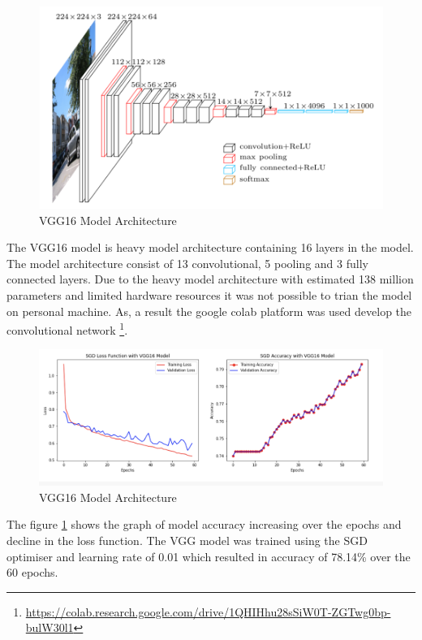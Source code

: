 \begin{figure}[!htp]
    \centering
    \includegraphics[width=\textwidth]{Images/vgg16.png}
    \caption{VGG16 Model Architecture}
\end{figure}

The VGG16 model is heavy model architecture containing 16 layers in the 
model. The model architecture consist of 13 convolutional, 5 pooling and 3 fully connected 
layers. Due to the heavy model architecture with estimated 138 million parameters
and limited hardware resources it was not possible to trian the model on personal machine. As, a result the google colab platform was used develop
the convolutional network \footnote{\url{https://colab.research.google.com/drive/1QHIHhu28sSiW0T-ZGTwg0bp-bulW30l1}}.

\begin{figure}[!htp]
    \centering
    \includegraphics[width=\textwidth]{Images/vgg16Results.png}
    \caption{VGG16 Model Architecture}
    \label{fig:vggRes}
\end{figure}
The figure \ref{fig:vggRes} shows the graph of model accuracy increasing over the 
epochs and decline in the loss function. The VGG model was trained using the SGD optimiser and learning 
rate of 0.01 which resulted in accuracy of 78.14\% over the 60 epochs. 

